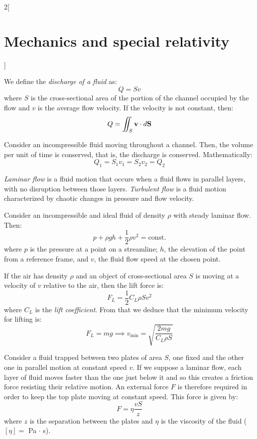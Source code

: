 \documentclass[../../../main.tex]{subfiles}
\begin{document}
\begin{multicols}{2}[\section{Mechanics and special relativity}]
\begin{prop}
  \end{prop}
  \begin{definition}
    We define the \textit{discharge of a fluid} as: $$Q=Sv$$ where $S$ is the cross-sectional area of the portion of the channel occupied by the flow and $v$ is the average flow velocity. If the velocity is not constant, then: $$Q=\iint_S\vb{v}\cdot d\vb{S}$$
  \end{definition}
  \begin{prop}
    Consider an incompressible fluid moving throughout a channel. Then, the volume per unit of time is conserved, that is, the discharge is conserved. Mathematically: $$Q_1=S_1v_1=S_2v_2=Q_2$$
  \end{prop}
  \begin{definition}
    \textit{Laminar flow} is a fluid motion that occurs when a fluid flows in parallel layers, with no disruption between those layers. \textit{Turbulent flow} is a fluid motion characterized by chaotic changes in pressure and flow velocity.
  \end{definition}
  \begin{center}
    \begin{minipage}{\linewidth}
      \centering
      
    \end{minipage}
  \end{center}
  \begin{prop}
    Consider an incompressible and ideal fluid of density $\rho$ with steady laminar flow. Then: $$p+\rho gh+\frac{1}{2}\rho v^2=\text{const.}$$ where $p$ is the pressure at a point on a streamline; $h$, the elevation of the point from a reference frame, and $v$, the fluid flow speed at the chosen point.
  \end{prop}
  \begin{prop}
    If the air has density $\rho$ and an object of cross-sectional area $S$ is moving at a velocity of $v$ relative to the air, then the lift force is: $$F_L=\frac{1}{2}C_L\rho Sv^2$$ where $C_L$ is the \textit{lift coefficient}. From that we deduce that the minimum velocity for lifting is: $$F_L=mg\implies v_\text{min}=\sqrt{\frac{2mg}{C_L\rho S}}$$
  \end{prop}
  \begin{prop}[Viscosity]
    Consider a fluid trapped between two plates of area $S$, one fixed and the other one in parallel motion at constant speed $v$. If we suppose a laminar flow, each layer of fluid moves faster than the one just below it and so this creates a friction force  resisting their relative motion. An external force $F$ is therefore required in order to keep the top plate moving at constant speed. This force is given by: $$F=\eta\frac{vS}{z}$$ where $z$ is the separation between the plates and $\eta$ is the viscosity of the fluid ($[\eta]=$ Pa $\cdot$ s).

\end{prop}
\end{multicols}
\end{document}

